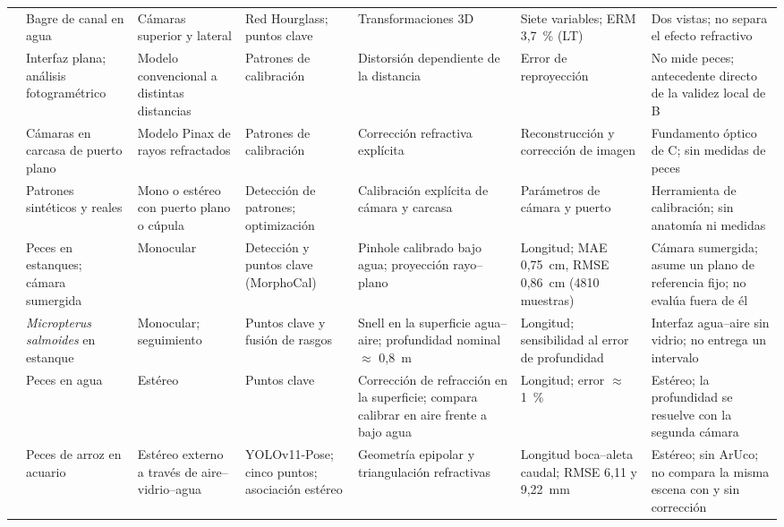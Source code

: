\documentclass{report}
\begin{document}
\begin{longtable}{@{}p{2.2cm}p{2.8cm}p{2.6cm}p{3.0cm}p{3.0cm}p{3.2cm}p{3.6cm}@{}}
\textcite{ZhangX2025} & Bagre de canal en agua & Cámaras superior y lateral & Red Hourglass; puntos clave & Transformaciones 3D & Siete variables; ERM 3,7~\% (LT) & Dos vistas; no separa el efecto refractivo \\
\textcite{Rofallski2022} & Interfaz plana; análisis fotogramétrico & Modelo convencional a distintas distancias & Patrones de calibración & Distorsión dependiente de la distancia & Error de reproyección & No mide peces; antecedente directo de la validez local de B \\
\textcite{Luczynski2017} & Cámaras en carcasa de puerto plano & Modelo Pinax de rayos refractados & Patrones de calibración & Corrección refractiva explícita & Reconstrucción y corrección de imagen & Fundamento óptico de C; sin medidas de peces \\
\textcite{Seegraber2025} & Patrones sintéticos y reales & Mono o estéreo con puerto plano o cúpula & Detección de patrones; optimización & Calibración explícita de cámara y carcasa & Parámetros de cámara y puerto & Herramienta de calibración; sin anatomía ni medidas \\
\textcite{Vijayalakshmi2026} & Peces en estanques; cámara sumergida & Monocular & Detección y puntos clave (MorphoCal) & Pinhole calibrado bajo agua; proyección rayo--plano & Longitud; MAE 0,75~cm, RMSE 0,86~cm (4810 muestras) & Cámara sumergida; asume un plano de referencia fijo; no evalúa fuera de él \\
\textcite{Yin2026} & \emph{Micropterus salmoides} en estanque & Monocular; seguimiento & Puntos clave y fusión de rasgos & Snell en la superficie agua--aire; profundidad nominal $\approx$ 0,8~m & Longitud; sensibilidad al error de profundidad & Interfaz agua--aire sin vidrio; no entrega un intervalo \\
\textcite{Zhou2023} & Peces en agua & Estéreo & Puntos clave & Corrección de refracción en la superficie; compara calibrar en aire frente a bajo agua & Longitud; error $\approx$ 1~\% & Estéreo; la profundidad se resuelve con la segunda cámara \\
\textcite{Seibold2026} & Peces de arroz en acuario & Estéreo externo a través de aire--vidrio--agua & YOLOv11-Pose; cinco puntos; asociación estéreo & Geometría epipolar y triangulación refractivas & Longitud boca--aleta caudal; RMSE 6,11 y 9,22~mm & Estéreo; sin ArUco; no compara la misma escena con y sin corrección \\
\end{longtable}
\end{document}
